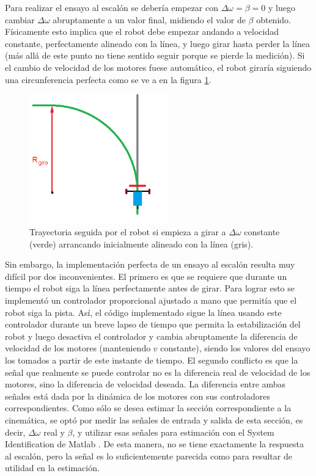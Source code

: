 \documentclass[10pt,conference,a4paper,onecolumn]{article}%
\begin{document}
Para realizar el ensayo al escalón se debería empezar con $\Delta \omega = \beta = 0$  y luego cambiar $\Delta \omega$  abruptamente a un valor final, midiendo el valor de $\beta$ obtenido. Físicamente esto implica que el robot debe empezar andando a velocidad constante, perfectamente alineado con la línea, y luego girar hasta perder la línea (más allá de este punto no tiene sentido seguir porque se pierde la medición).
Si el cambio de velocidad de los motores fuese automático, el robot giraría siguiendo una circunferencia perfecta como se ve a en la figura \ref{fig:carritoEsc}.
\begin{figure}[h!]
\centering
\includegraphics[width=6cm]{./imagenes/carrito_Ensayo_escalon.png}
\caption{Trayectoria seguida por el robot si empieza a girar a $\Delta \omega $ constante (verde) arrancando inicialmente alineado con la línea (gris).}
\label{fig:carritoEsc}
\end{figure}

Sin embargo, la implementación perfecta de un ensayo al escalón resulta muy difícil por dos inconvenientes. El primero es que se requiere que durante un tiempo el robot siga la línea perfectamente antes de girar. Para lograr esto se implementó un controlador proporcional ajustado a mano que permitía que el robot siga la pista. Así, el código implementado sigue la línea usando este controlador durante un breve lapso de tiempo que permita la estabilización del robot y luego desactiva el controlador y cambia abruptamente la diferencia de velocidad de los motores (manteniendo $v$ constante), siendo los valores del ensayo los tomados a partir de este instante de tiempo.
El segundo conflicto es que la señal que realmente se puede controlar no es la diferencia real de velocidad de los motores, sino la diferencia de velocidad deseada. La diferencia entre ambas señales está dada por la dinámica de los motores con sus controladores correspondientes. Como sólo se desea estimar la sección correspondiente a la cinemática, se optó por medir las señales de entrada y salida de esta sección, es decir, $\Delta \omega$ real y $\beta$, y utilizar esas señales para estimación con el System Identification de Matlab \cite{Sys_ident} . De esta manera, no se tiene exactamente la respuesta al escalón, pero la señal es lo suficientemente parecida como para resultar de utilidad en la estimación.
\end{document}
